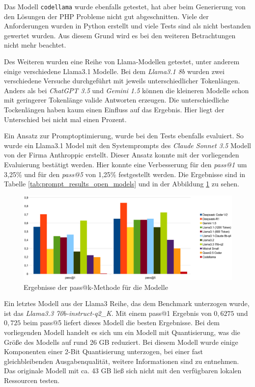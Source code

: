 Das Modell \texttt{codellama} wurde ebenfalls getestet, hat aber beim Generierung von den Lösungen der PHP Probleme nicht gut abgeschnitten. Viele der Anforderungen wurden in Python erstellt und viele Tests sind als nicht bestanden gewertet wurden. Aus diesem Grund wird es bei den weiteren Betrachtungen nicht mehr beachtet.\vspace{0.2cm}

Des Weiteren wurden eine Reihe von Llama-Modellen getestet, unter anderem einige verschiedene Llama3.1 Modelle. Bei dem \textit{Llama3.1 8b} wurden zwei verschiedene Versuche durchgeführt mit jeweils unterschiedlicher Tokenlängen. Anders als bei \textit{ChatGPT 3.5} und \textit{Gemini 1.5} können die kleineren Modelle schon mit geringerer Tokenlänge valide Antworten erzeugen. Die unterschiedliche Tockenlängen haben kaum einen Einfluss auf das Ergebnis. Hier liegt der Unterschied bei nicht mal einen Prozent.\vspace{0.2cm}

Ein Ansatz zur Promptoptimierung, wurde bei den Tests ebenfalls evaluiert. So wurde ein Llama3.1 Model mit den Systemprompts des \textit{Claude Sonnet 3.5} Modell von der Firma Anthroppic erstellt. Dieser Ansatz konnte mit der vorliegenden Evaluierung bestätigt werden. Hier konnte eine Verbesserung für den \textit{pass@1} um 3,25\% und für den \textit{pass@5} von 1,25\% festgestellt werden. Die Ergebnisse sind in Tabelle \ref{tab:prompt_results_open_models} und in der Abbildung \ref{img:pass_at_k_results_by_llm} zu sehen.\vspace{0.2cm}

\begin{figure}[!ht]
	\includegraphics[width=\textwidth]{content/chapter_evaluation/images/llm_evaluation.eps}
	\centering
	\caption{Ergebnisse der pass@k-Methode für die Modelle}
	\label{img:pass_at_k_results_by_llm}
\end{figure}

Ein letztes Modell aus der Llama3 Reihe, das dem Benchmark unterzogen wurde, ist das \textit{Llama3.3 70b-instruct-q2\_K}. Mit einem pass@1 Ergebnis von $0,6275$ und $0,725$ beim pass@5 liefert dieses Modell die besten Ergebnisse. Bei dem vorliegenden Modell handelt es sich um ein Modell mit Quantisierung, was die Größe des Modells auf rund 26 GB reduziert.
Bei diesem Modell wurde einige Komponenten einer 2-Bit Quantisierung unterzogen, bei einer fast gleichbleibenden Ausgabenqualität, weitere Informationen sind \cite{hugging-face-2025} zu entnehmen. Das originale Modell mit ca. 43 GB ließ sich nicht mit den verfügbaren lokalen Ressourcen testen.\vspace{0.2cm}

